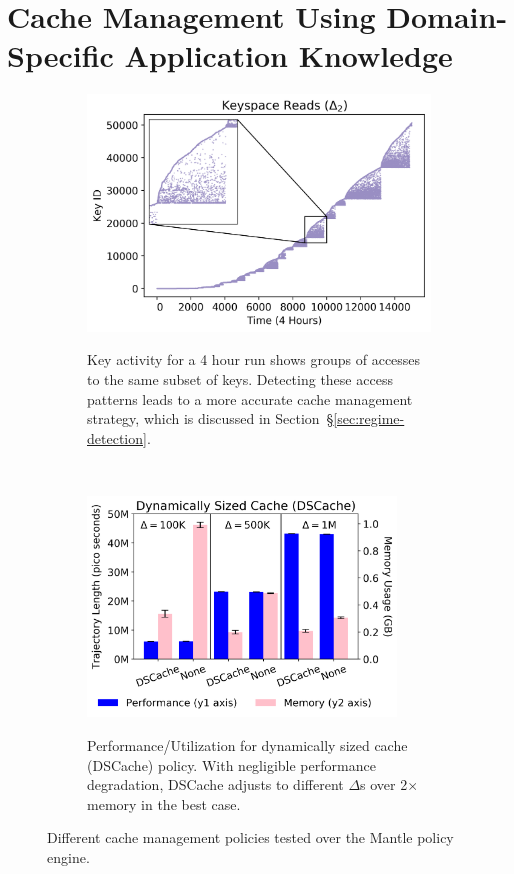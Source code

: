 \section{Cache Management Using Domain-Specific Application Knowledge}
\label{sec:dom-specific}

\begin{figure}[t!]
    \begin{subfigure}[t]{0.5\textwidth}
        \centering
	\includegraphics[width=1\textwidth]{figures/keyspace-zoomed.png}\\
\caption{Key activity for a 4 hour run shows groups of accesses to the same
subset of keys. Detecting these access patterns leads to a more accurate cache
management strategy, which is discussed in
Section~\S\ref{sec:regime-detection}.\label{fig:keyspace-zoomed}}
    \end{subfigure}%
    ~ 
    \begin{subfigure}[t]{0.5\textwidth}
        \centering
        \includegraphics[width=0.9\textwidth]{figures/dscache-vs-none.png}\\
	\caption{Performance/Utilization for dynamically sized cache (DSCache)
policy. With negligible performance degradation, DSCache adjusts to different
\(\Delta\)s over 2\(\times\) memory in the best case.
\label{fig:dscache-vs-none}}
    \end{subfigure}%
    \caption{Different cache management policies tested over the Mantle policy engine.}
\end{figure}

